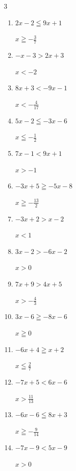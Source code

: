 \begin{multicols}{3}
\begin{enumerate}
  \item $2x-2\leqq 9x+1$

        $\displaystyle x\geqq -\frac{3}{7}$

  \item $-x-3>2x+3$

        $\displaystyle x<-2$

  \item $8x+3<-9x-1$

        $\displaystyle x<-\frac{4}{17}$

  \item $5x-2\leqq -3x-6$

        $\displaystyle x\leqq -\frac{1}{2}$

\columnbreak %

  \item $7x-1<9x+1$

        $\displaystyle x>-1$

  \item $-3x+5\geqq -5x-8$

        $\displaystyle x\geqq -\frac{13}{2}$

  \item $-3x+2>x-2$

        $\displaystyle x<1$

  \item $3x-2>-6x-2$

        $\displaystyle x>0$

  \item $7x+9>4x+5$

        $\displaystyle x>-\frac{4}{3}$

  \item $3x-6\geqq -8x-6$

        $\displaystyle x\geqq 0$

  \item $-6x+4\geqq x+2$

        $\displaystyle x\leqq \frac{2}{7}$

  \item $-7x+5<6x-6$

        $\displaystyle x>\frac{11}{13}$

  \item $-6x-6\leqq 8x+3$

        $\displaystyle x\geqq -\frac{9}{14}$

  \item $-7x-9<5x-9$

        $\displaystyle x>0$


\end{enumerate}
\end{multicols}
